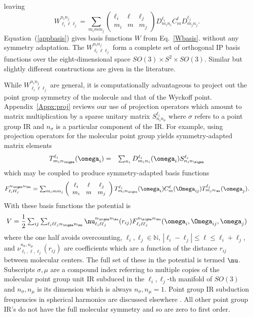 \documentclass[preprint]{iucr}              %
\newcommand{\mb}[1]{\ensuremath{\mbox{\boldmath $ #1 $}}}
\begin{document}
leaving
\begin{equation}
\label{appbasis}W^{n_i n_j}_{\ell_i \ell
\ell_j}=\sum_{m_imm_j}\left(\begin{array}{ccc} \ell_i & \ell & \ell_j \\
m_i & m & m_j
\end{array}\right)D^{\ell_i}_{m_in_i}C^\ell_m D^{\ell_j}_{m_jn_j}.
\end{equation}
Equation~(\ref{appbasis}) gives basis functions $W$ from Eq.~\ref{Wbasis}.
without any
symmetry adaptation.  The $W^{n_i n_j}_{\ell_i \ell \ell_j}$ form a complete set
of orthogonal IP
basis functions over the eight-dimensional space $SO(3)\times
S^2\times SO(3)$. Similar but slightly different constructions are given in the
literature\cite{Avoird80,Briels80,Stone84,Avoird94}.

While $W^{n_i n_j}_{\ell_i \ell \ell_j}$ are
general, it is computationally advantageous to project out
the point group symmetry of the molecule and that of the Wyckoff
point. Appendix~\ref{Appx:proj} reviews our use of projection
operators which amount to matrix multiplication by a sparse
unitary matrix $S^{\ell_i}_{n_in_\sigma}$ where $\sigma$ refers to
a point group IR and $n_\sigma$ is a particular component of the
IR. For example, using projection operators for the molecular
point group yields symmetry-adapted matrix elements
\begin{eqnarray}
\label{eq:Tfunc}T^{\ell_i}_{m_i n_\sigma}(\mb{\omega}_i)&=&\sum_{n_i}D_{m_i
n_i}^{\ell_i}(\mb{\omega}_i)S^{\ell_i}_{n_in_\sigma}
\end{eqnarray}
which may be coupled to produce symmetry-adapted basis functions
\begin{equation}
\label{basis}F_{\ell_i\ell\ell_j}^{n_\sigma
n_\mu}=\sum_{m_imm_j}\left(\begin{array}{ccc} \ell_i & \ell & \ell_j \\
m_i & m & m_j
\end{array}\right)T^{\ell_i}_{m_i n_\sigma}(\mb{\omega}_i)
C^\ell_m(\mb{\Omega}_{ij}) T^{\ell_j}_{m_j n_\mu}(\mb{\omega}_j).
\end{equation}
With these basis functions the potential is
\begin{equation}
\label{eq:vij} V = \frac{1}{2}\sum_{ij} \sum_{\ell_i \ell \ell_j
n_\sigma n_\mu} \nu_{\ell_i\ell\ell_j}^{n_\sigma n_\mu}(r_{ij})
F_{\ell_i\ell\ell_j}^{n_\sigma
n_\mu}(\mb{\omega}_i,\mb{\Omega}_{ij},\mb{\omega}_j)
\end{equation}
where the one half avoids overcounting,
$\ell_i,\ell_j\in\mathbb{N}$, $|\ell_i-\ell_j|\leq\ell\leq
\ell_i+\ell_j$, and
$\nu_{\ell_i,\ell,\ell_j}^{n_\sigma,n_\mu}(r_{ij})$ are
coefficients which are a function of the distance $r_{ij}$ between
molecular centers. The full set of these in the potential is
termed $\mb{\nu}$. Subscripts $\sigma,\mu$ are a compound index
referring to multiple copies of the molecular point group unit IR
subduced in the $\ell_i,\ell_j$-th manifold of $SO(3)$ and
$n_\sigma,n_\mu$ is its dimension which is always
$n_\sigma,n_\mu=1$.  Point group IR subduction frequencies in
spherical harmonics are discussed elsewhere \cite{Bradley72}. All
other point group IR's do not have the full molecular symmetry and
so are zero to first order.
\end{document}
